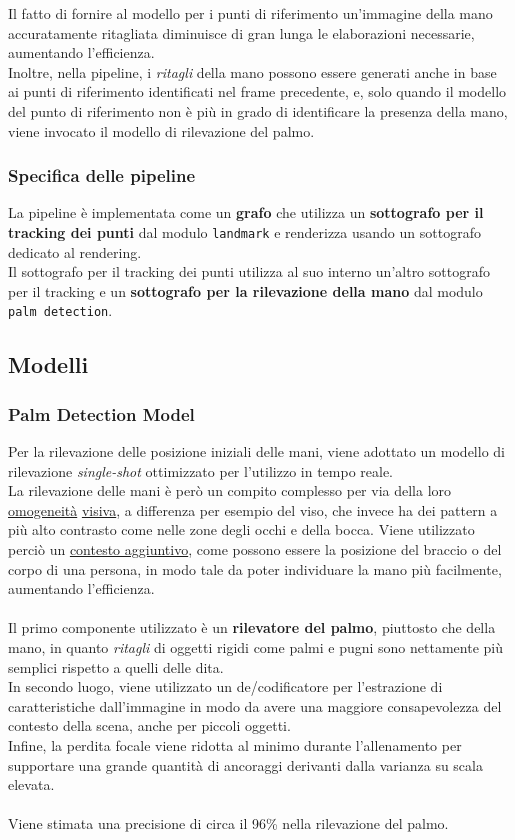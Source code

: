 \noindent Il fatto di fornire al modello per i punti di riferimento un'immagine della mano accuratamente ritagliata diminuisce di gran lunga le elaborazioni necessarie, aumentando l'efficienza.\\
Inoltre, nella pipeline, i \textit{ritagli} della mano possono essere generati anche in base ai punti di riferimento identificati nel frame precedente, e, solo quando il modello del punto di riferimento non è più in grado di identificare la presenza della mano, viene invocato il modello di rilevazione del palmo.

\subsubsection{Specifica delle pipeline}
La pipeline è implementata come un \textbf{grafo} che utilizza un \textbf{sottografo per il tracking dei punti} dal modulo \texttt{landmark} e renderizza usando un sottografo dedicato al rendering.\\Il sottografo per il tracking dei punti utilizza al suo interno un'altro sottografo per il tracking e un \textbf{sottografo per la rilevazione della mano} dal modulo \texttt{palm detection}.

\subsection{Modelli}

\subsubsection{Palm Detection Model} 

Per la rilevazione delle posizione iniziali delle mani, viene adottato un modello di rilevazione \textit{single-shot} ottimizzato per l'utilizzo in tempo reale.\\
La rilevazione delle mani è però un compito complesso per via della loro \underline{omogeneità} \underline{visiva}, a differenza per esempio del viso, che invece ha dei pattern a più alto contrasto come nelle zone degli occhi e della bocca.
Viene utilizzato perciò un \underline{contesto aggiuntivo}, come possono essere la posizione del braccio o del corpo di una persona, in modo tale da poter individuare la mano più facilmente, aumentando l'efficienza.\\
\\
\noindent Il primo componente utilizzato è un \textbf{rilevatore del palmo}, piuttosto che della mano, in quanto \textit{ritagli} di oggetti rigidi come palmi e pugni sono nettamente più semplici rispetto a quelli delle dita.\\
In secondo luogo, viene utilizzato un de/codificatore per l'estrazione di caratteristiche dall'immagine in modo da avere una maggiore consapevolezza del contesto della scena, anche per piccoli oggetti.\\
Infine, la perdita focale viene ridotta al minimo durante l'allenamento per supportare una grande quantità di ancoraggi derivanti dalla varianza su scala elevata.\\
\\
\noindent Viene stimata una precisione di circa il 96\% nella rilevazione del palmo.

